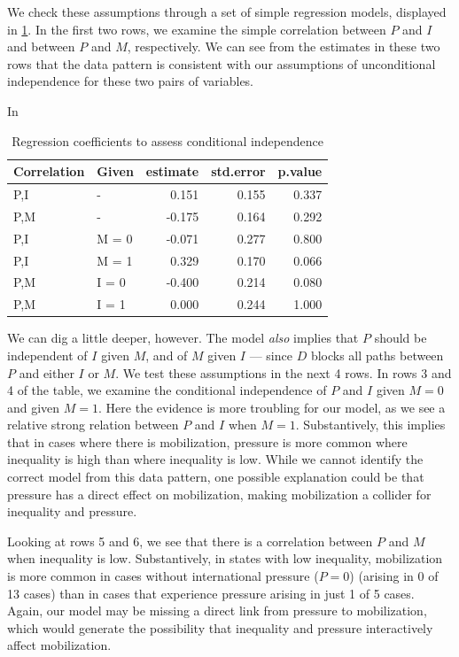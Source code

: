 \documentclass[
  12pt,
]{book}
\begin{document}
We check these assumptions through a set of simple regression models, displayed in \ref{tab:ch15cipimd}. In the first two rows, we examine the simple correlation between \(P\) and \(I\) and between \(P\) and \(M\), respectively. We can see from the estimates in these two rows that the data pattern is consistent with our assumptions of unconditional independence for these two pairs of variables.

In

\begin{table}

\caption{\label{tab:ch15cipimd}Regression coefficients to assess conditional independence}
\centering
\begin{tabular}[t]{l|l|r|r|r}
\hline
Correlation & Given & estimate & std.error & p.value\\
\hline
P,I & - & 0.151 & 0.155 & 0.337\\
\hline
P,M & - & -0.175 & 0.164 & 0.292\\
\hline
P,I & M = 0 & -0.071 & 0.277 & 0.800\\
\hline
P,I & M = 1 & 0.329 & 0.170 & 0.066\\
\hline
P,M & I = 0 & -0.400 & 0.214 & 0.080\\
\hline
P,M & I = 1 & 0.000 & 0.244 & 1.000\\
\hline
\end{tabular}
\end{table}

We can dig a little deeper, however. The model \emph{also} implies that \(P\) should be independent of \(I\) given \(M\), and of \(M\) given \(I\) --- since \(D\) blocks all paths between \(P\) and either \(I\) or \(M\). We test these assumptions in the next 4 rows. In rows 3 and 4 of the table, we examine the conditional independence of \(P\) and \(I\) given \(M=0\) and given \(M=1\). Here the evidence is more troubling for our model, as we see a relative strong relation between \(P\) and \(I\) when \(M=1\). Substantively, this implies that in cases where there is mobilization, pressure is more common where inequality is high than where inequality is low. While we cannot identify the correct model from this data pattern, one possible explanation could be that pressure has a direct effect on mobilization, making mobilization a collider for inequality and pressure.

Looking at rows 5 and 6, we see that there is a correlation between \(P\) and \(M\) when inequality is low. Substantively, in states with low inequality, mobilization is more common in cases without international pressure (\(P=0\)) (arising in 0 of 13 cases) than in cases that experience pressure arising in just 1 of 5 cases. Again, our model may be missing a direct link from pressure to mobilization, which would generate the possibility that inequality and pressure interactively affect mobilization.
\end{document}
